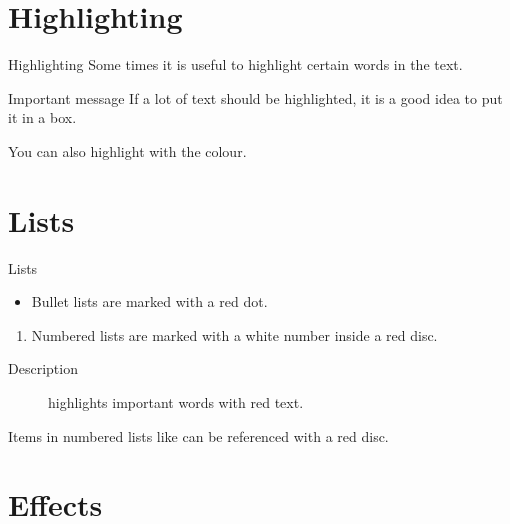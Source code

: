 \documentclass[UKenglish]{beamer}
\begin{document}
\section{Highlighting}
\SectionPage


\begin{frame}{Highlighting}
    Some times it is useful to \alert{highlight} certain words in the text.
    
    \begin{alertblock}{Important message}
        If a lot of text should be \alert{highlighted}, it is a good idea to put it in a box.
    \end{alertblock}
    
    You can also highlight with the  colour.
\end{frame}


\section{Lists}


\begin{frame}{Lists}
    \begin{itemize}
        \item
        Bullet lists are marked with a red dot.
    \end{itemize}
    
    \begin{enumerate}
        \item
        \label{enum:item}
        Numbered lists are marked with a white number inside a red disc.
    \end{enumerate}

    \begin{description}
        \item[Description]
        highlights important words with red text.
    \end{description}

    Items in numbered lists like  can be referenced with a red disc.
\end{frame}


\section{Effects}
\end{document}
